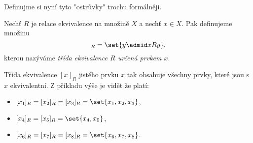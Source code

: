 Definujme si nyní tyto "ostrůvky" trochu formálněji.
\begin{definition}
    Nechť $R$ je relace ekvivalence na množině $X$ a nechť $x\in X$. Pak definujeme množinu
    \begin{equation*}
        [x]_R=\set{y \admid xRy},
    \end{equation*}
    kterou nazýváme \emph{třída ekvivalence $R$ určená prvkem $x$}.
\end{definition}
Třída ekvivalence $[x]_R$ jistého prvku $x$ tak obsahuje všechny prvky, které jsou s $x$ ekvivalentní. Z příkladu výše je vidět že platí:
\begin{itemize}
    \item $[x_1]_R=[x_2]_R=[x_3]_R=\set{x_1,x_2,x_3}$,
    \item $[x_4]_R=[x_5]_R=\set{x_4,x_5}$,
    \item $[x_6]_R=[x_7]_R=[x_8]_R=\set{x_6,x_7,x_8}$.
\end{itemize}
